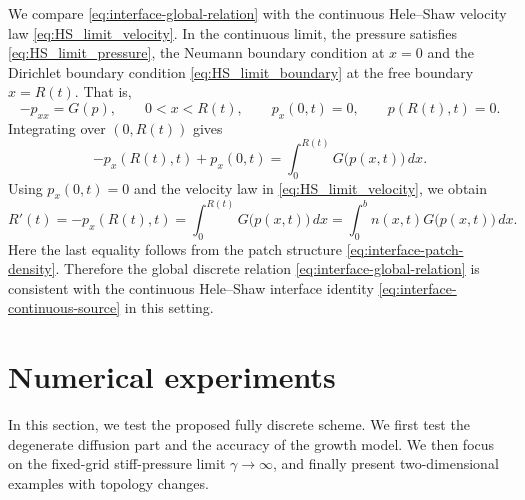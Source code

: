 \documentclass[11pt]{article}
\theoremstyle{plain}
\numberwithin{equation}{section}
\newtheorem{remark}{Remark}[section]
\begin{document}
We compare \eqref{eq:interface-global-relation} with the continuous
Hele--Shaw velocity law \eqref{eq:HS_limit_velocity}. In the continuous limit, the pressure satisfies \eqref{eq:HS_limit_pressure},  the Neumann boundary condition at $x=0$ and the Dirichlet boundary condition \eqref{eq:HS_limit_boundary} at the free boundary $x=R(t)$. That is, 
\[
-p_{xx}=G(p),\qquad 0<x<R(t),
\qquad
p_x(0,t)=0,\qquad p(R(t),t)=0 .
\]
Integrating over \((0,R(t))\) gives
\[
-p_x(R(t),t)+p_x(0,t)
=
\int_0^{R(t)}G\bigl(p(x,t)\bigr)\,dx .
\]
Using \(p_x(0,t)=0\) and the velocity law in \eqref{eq:HS_limit_velocity}, we obtain
\begin{equation}
R'(t)
=
-p_x(R(t),t)
=
\int_0^{R(t)}G\bigl(p(x,t)\bigr)\,dx
=
\int_0^b n(x,t)G\bigl(p(x,t)\bigr)\,dx .
\label{eq:interface-continuous-source}
\end{equation}
Here the last equality follows from the patch structure
\eqref{eq:interface-patch-density}. Therefore the global discrete relation \eqref{eq:interface-global-relation}  is consistent with
the continuous Hele--Shaw interface identity \eqref{eq:interface-continuous-source} in this setting.






\section{Numerical experiments}
\label{sec:numerical-experiments}
\label{sec:numerics}


In this section, we test the proposed fully discrete scheme. We first test the
degenerate diffusion part and the accuracy of the growth model. We then focus
on the fixed-grid stiff-pressure limit \(\gamma\to\infty\), and finally present
two-dimensional examples with topology changes.
\end{document}

